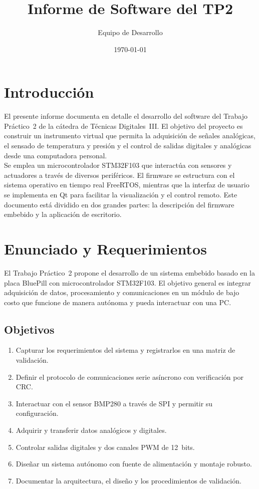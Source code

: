 \documentclass{article}
\title{Informe de Software del TP2}
\author{Equipo de Desarrollo}
\date{\today}
\begin{document}
\maketitle
\tableofcontents
\newpage

\section{Introducción}
El presente informe documenta en detalle el desarrollo del software del Trabajo Práctico~2 de la cátedra de Técnicas Digitales~III. El objetivo del proyecto es construir un instrumento virtual que permita la adquisición de señales analógicas, el sensado de temperatura y presión y el control de salidas digitales y analógicas desde una computadora personal.\\
Se emplea un microcontrolador STM32F103 que interactúa con sensores y actuadores a través de diversos periféricos. El firmware se estructura con el sistema operativo en tiempo real FreeRTOS, mientras que la interfaz de usuario se implementa en Qt para facilitar la visualización y el control remoto. Este documento está dividido en dos grandes partes: la descripción del firmware embebido y la aplicación de escritorio.

\section{Enunciado y Requerimientos}
El Trabajo Práctico~2 propone el desarrollo de un sistema embebido basado en la placa BluePill con microcontrolador STM32F103. El objetivo general es integrar adquisición de datos, procesamiento y comunicaciones en un módulo de bajo costo que funcione de manera autónoma y pueda interactuar con una PC.

\subsection{Objetivos}
\begin{enumerate}
    \item Capturar los requerimientos del sistema y registrarlos en una matriz de validación.
    \item Definir el protocolo de comunicaciones serie asíncrono con verificación por CRC.
    \item Interactuar con el sensor BMP280 a través de SPI y permitir su configuración.
    \item Adquirir y transferir datos analógicos y digitales.
    \item Controlar salidas digitales y dos canales PWM de 12~bits.
    \item Diseñar un sistema autónomo con fuente de alimentación y montaje robusto.
    \item Documentar la arquitectura, el diseño y los procedimientos de validación.
\end{enumerate}
\end{document}
